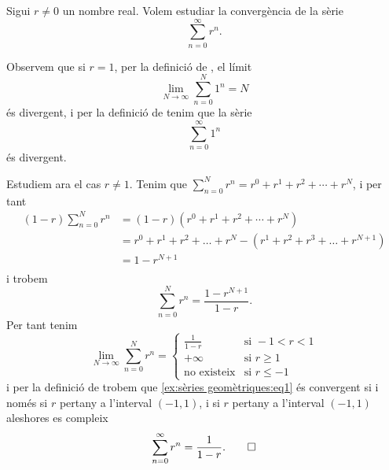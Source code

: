 \documentclass[../Apunts.tex]{subfiles}
\begin{document}
	\begin{example}
		\label{ex:sèries geomètriques}
		Sigui \(r\neq0\) un nombre real. Volem estudiar la convergència de la sèrie
		\begin{equation}
			\label{ex:sèries geomètriques:eq1}
			\sum_{n=0}^{\infty}r^{n}.
		\end{equation}
		\begin{solution}
			Observem que si \(r=1\), per la definició de , el límit
			\[\lim_{N\to\infty}\sum_{n=0}^{N}1^{n}=N\]
			és divergent, i per la definició de  tenim que la sèrie
			\[\sum_{n=0}^{\infty}1^{n}\]
			és divergent.
			
			Estudiem ara el cas \(r\neq1\). Tenim que \(\sum_{n=0}^{N}r^{n}=r^{0}+r^{1}+r^{2}+\cdots+r^{N}\), i per tant
			\begin{align*}
				(1-r)\sum_{n=0}^{N}r^{n}&=(1-r)(r^{0}+r^{1}+r^{2}+\cdots+r^{N})\\
				&=r^{0}+r^{1}+r^{2}+\dots+r^{N}-(r^{1}+r^{2}+r^{3}+\dots+r^{N+1})\\
				&=1-r^{N+1}\\
			\end{align*}
			i trobem
			\begin{equation*}
				\sum_{n=0}^{N}r^{n}=\frac{1-r^{N+1}}{1-r}.
			\end{equation*}
			Per tant tenim
			\[\lim_{N\to\infty}\sum_{n=0}^{N}r^{n}=
			\begin{cases}
				\displaystyle \frac{1}{1-r} & \text{si }-1<r<1 \\
				+\infty & \text{si }r\geq1 \\
				\text{no existeix} & \text{si }r\leq-1 
			\end{cases}\]
			i per la definició de  trobem que \eqref{ex:sèries geomètriques:eq1} és convergent si i només si \(r\) pertany a l'interval \((-1,1)\), i si \(r\) pertany a l'interval \((-1,1)\) aleshores es compleix
			\begin{equation*}
				\sum_{n=0}^{\infty}r^{n}=\frac{1}{1-r}.\qedhere
			\end{equation*}
		\end{solution}
	\end{example}
\end{document}
